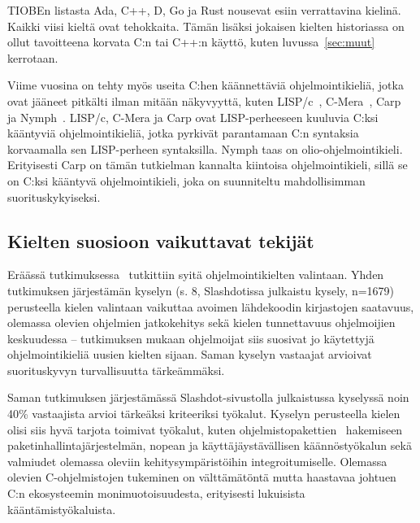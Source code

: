 TIOBEn listasta Ada, C++, D, Go ja Rust nousevat esiin verrattavina kielinä.
Kaikki viisi kieltä ovat tehokkaita. Tämän lisäksi jokaisen kielten historiassa
on ollut tavoitteena korvata C:n tai C++:n käyttö, kuten luvussa~\ref{sec:muut}
kerrotaan.

Viime vuosina on tehty myös useita C:hen käännettäviä ohjelmointikieliä, jotka
ovat jääneet pitkälti ilman mitään näkyvyyttä, kuten LISP/c~\citep{clisp1},
C-Mera~\citep{clisp2}, Carp~\citep{clisp3} ja Nymph~\citep{nymph}. LISP/c,
C-Mera ja Carp ovat LISP-perheeseen kuuluvia C:ksi kääntyviä ohjelmointikieliä,
jotka pyrkivät parantamaan C:n syntaksia korvaamalla sen LISP-perheen
syntaksilla. Nymph taas on olio-ohjelmointikieli. Erityisesti Carp on tämän
tutkielman kannalta kiintoisa ohjelmointikieli, sillä se on C:ksi kääntyvä
ohjelmointikieli, joka on suunniteltu mahdollisimman suorituskykyiseksi.


\subsection{Kielten suosioon vaikuttavat tekijät}
\label{sec:suosio}

Eräässä tutkimuksessa~\citep{empiricalpopularity} tutkittiin syitä
ohjelmointikielten valintaan. Yhden tutkimuksen järjestämän kyselyn (s. 8,
\mbox{Slashdotissa} julkaistu kysely, n=1679) perusteella kielen valintaan
vaikuttaa avoimen lähdekoodin kirjastojen saatavuus, olemassa olevien ohjelmien
jatkokehitys sekä kielen tunnettavuus ohjelmoijien keskuudessa -- tutkimuksen
mukaan ohjelmoijat siis suosivat jo käytettyjä ohjelmointikieliä uusien kielten
sijaan. Saman kyselyn vastaajat arvioivat suorituskyvyn turvallisuutta
tärkeämmäksi.

Saman tutkimuksen järjestämässä Slashdot-sivustolla julkaistussa kyselyssä noin
40\% vastaajista arvioi tärkeäksi kriteeriksi työkalut. Kyselyn perusteella
kielen olisi siis hyvä tarjota toimivat työkalut, kuten
ohjelmistopakettien~ hakemiseen
paketinhallintajärjestelmän, nopean ja
käyttäjäystävällisen käännöstyökalun sekä valmiudet olemassa oleviin
kehitysympäristöihin integroitumiselle. Olemassa olevien C-ohjelmistojen
tukeminen on välttämätöntä mutta haastavaa johtuen C:n ekosysteemin
monimuotoisuudesta, erityisesti lukuisista kääntämistyökaluista.

